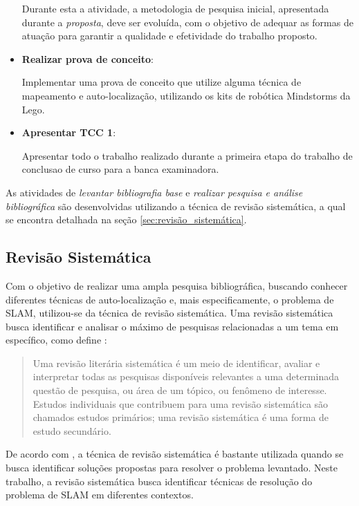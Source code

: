\begin{itemize}
		Durante esta a atividade, a metodologia de pesquisa inicial, apresentada durante a \textit{proposta}, deve ser evoluída, com o objetivo de adequar as formas de atuação para garantir a qualidade e efetividade do trabalho proposto. 

	\item \textbf{Realizar prova de conceito}:

		Implementar uma prova de conceito que utilize alguma técnica de mapeamento e auto-localização, utilizando os kits de robótica Mindstorms da Lego.

	\item \textbf{Apresentar TCC 1}:

		Apresentar todo o trabalho realizado durante a primeira etapa do trabalho de conclusao de curso para a banca examinadora.
\end{itemize}

As atividades de \textit{levantar bibliografia base} e \textit{realizar pesquisa e análise bibliográfica} são desenvolvidas utilizando a técnica de revisão sistemática, a qual se encontra detalhada na seção \ref{sec:revisão_sistemática}.

\subsection{Revisão Sistemática} %
\label{sec:revisao_sistematica}
	
	Com o objetivo de realizar uma ampla pesquisa bibliográfica, buscando conhecer diferentes técnicas de auto-localização e, mais especificamente, o problema de SLAM, utilizou-se da técnica de revisão sistemática. Uma revisão sistemática busca identificar e analisar o máximo de pesquisas relacionadas a um tema em específico, como define \cite{revisaoSistematicaComunicacao}:

	 \begin{quote}
	 	Uma revisão literária sistemática é um meio de identificar, avaliar e interpretar
		todas as pesquisas disponíveis relevantes a uma determinada questão de pesquisa,
		ou área de um tópico, ou fenômeno de interesse. Estudos individuais que contribuem
		para uma revisão sistemática são chamados estudos primários; uma revisão
		sistemática é uma forma de estudo secundário.
	 \end{quote}

	 De acordo com \cite{revisaoSistematicaComunicacao}, a técnica de revisão sistemática é bastante utilizada quando se busca identificar soluções propostas para resolver o problema levantado. Neste trabalho, a revisão sistemática busca identificar técnicas de resolução do problema de SLAM em diferentes contextos.

